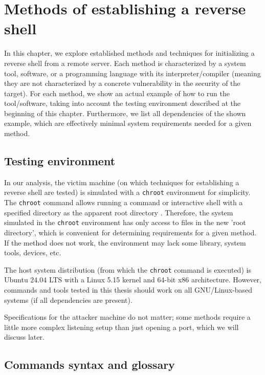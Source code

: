 \newcommand{\commandpath}[1]{chapters/chapter2/commands/#1}

\chapter{Methods of establishing a reverse shell}

\label{chap:methods}

In this chapter, we explore established methods and techniques for initializing a reverse shell from a remote server. Each method is characterized by a system tool, software, or a programming language with its interpreter/compiler (meaning they are not characterized by a concrete vulnerability in the security of the target). For each method, we show an actual example of how to run the tool/software, taking into account the testing environment described at the beginning of this chapter. Furthermore, we list all dependencies of the shown example, which are effectively minimal system requirements needed for a given method.

\section{Testing environment}

In our analysis, the victim machine (on which techniques for establishing a reverse shell are tested) is simulated with a \texttt{chroot} environment for simplicity. The \texttt{chroot} command allows running a command or interactive shell with a specified directory as the apparent root directory \cite{chroot-man}. Therefore, the system simulated in the \texttt{chroot} environment has only access to files in the new 'root directory', which is convenient for determining requirements for a given method. If the method does not work, the environment may lack some library, system tools, devices, etc.

The host system distribution (from which the \texttt{chroot} command is executed) is Ubuntu 24.04 LTS with a Linux 5.15 kernel and 64-bit x86 architecture. However, commands and tools tested in this thesis should work on all GNU/Linux-based systems (if all dependencies are present).

Specifications for the attacker machine do not matter; some methods require a little more complex listening setup than just opening a port, which we will discuss later.

\section{Commands syntax and glossary}

